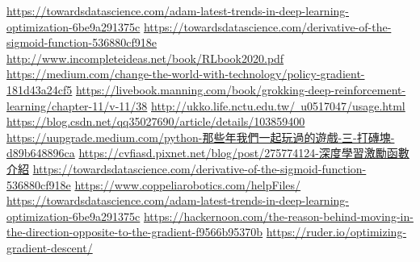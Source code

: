 \newpage
\renewcommand\bibname{參~考~文~獻}
\begin{thebibliography}{99}  %
\href{https://towardsdatascience.com/adam-latest-trends-in-deep-learning-optimization-6be9a291375c}{https://towardsdatascience.com/adam-latest-trends-in-deep-learning-optimization-6be9a291375c}
\href{https://towardsdatascience.com/derivative-of-the-sigmoid-function-536880cf918e}{https://towardsdatascience.com/derivative-of-the-sigmoid-function-536880cf918e}
\href{http://www.incompleteideas.net/book/RLbook2020.pdf}{http://www.incompleteideas.net/book/RLbook2020.pdf}
\href{https://medium.com/change-the-world-with-technology/policy-gradient-181d43a24cf5}{https://medium.com/change-the-world-with-technology/policy-gradient-181d43a24cf5}
\href{https://livebook.manning.com/book/grokking-deep-reinforcement-learning/chapter-11/v-11/38}{https://livebook.manning.com/book/grokking-deep-reinforcement-learning/chapter-11/v-11/38}
\href{http://ukko.life.nctu.edu.tw/~u0517047/usage.html}{http://ukko.life.nctu.edu.tw/~u0517047/usage.html}
\href{https://blog.csdn.net/qq_35027690/article/details/103859400}{https://blog.csdn.net/qq35027690/article/details/103859400}
\href{https://uupgrade.medium.com/python-那些年我們一起玩過的遊戲-三-打磚塊-d89b648896ca}{https://uupgrade.medium.com/python-那些年我們一起玩過的遊戲-三-打磚塊-d89b648896ca}
\href{https://cvfiasd.pixnet.net/blog/post/275774124-深度學習激勵函數介紹}{https://cvfiasd.pixnet.net/blog/post/275774124-深度學習激勵函數介紹}
\href{https://towardsdatascience.com/derivative-of-the-sigmoid-function-536880cf918e}{https://towardsdatascience.com/derivative-of-the-sigmoid-function-536880cf918e}
\href{https://www.coppeliarobotics.com/helpFiles/}{https://www.coppeliarobotics.com/helpFiles/}
\href{https://towardsdatascience.com/adam-latest-trends-in-deep-learning-optimization-6be9a291375c}{https://towardsdatascience.com/adam-latest-trends-in-deep-learning-optimization-6be9a291375c}
\href{https://hackernoon.com/the-reason-behind-moving-in-the-direction-opposite-to-the-gradient-f9566b95370b}{https://hackernoon.com/the-reason-behind-moving-in-the-direction-opposite-to-the-gradient-f9566b95370b}\label{OGD}
\href{https://ruder.io/optimizing-gradient-descent/}{https://ruder.io/optimizing-gradient-descent/}
\label{OGD2}

%
\end{thebibliography}
\newpage